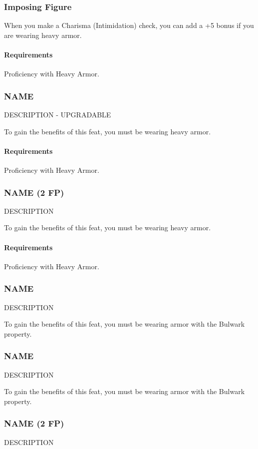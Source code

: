 \subsubsection{Imposing Figure} \label{feat::imposingfigure}
    When you make a Charisma (Intimidation) check, you can add a +5 bonus if you are wearing heavy armor.
    \paragraph{Requirements} Proficiency with Heavy Armor.
\subsubsection{NAME} \label{feat::name}
    DESCRIPTION - UPGRADABLE

    To gain the benefits of this feat, you must be wearing heavy armor.
    \paragraph{Requirements} Proficiency with Heavy Armor.
\subsubsection{NAME (2 FP)} \label{feat::name}
    DESCRIPTION

    To gain the benefits of this feat, you must be wearing heavy armor.
    \paragraph{Requirements} Proficiency with Heavy Armor.

\subsubsection{NAME} \label{feat::name}
    DESCRIPTION

    To gain the benefits of this feat, you must be wearing armor with the Bulwark property.
\subsubsection{NAME} \label{feat::name}
    DESCRIPTION

    To gain the benefits of this feat, you must be wearing armor with the Bulwark property.
\subsubsection{NAME (2 FP)} \label{feat::name}
    DESCRIPTION

